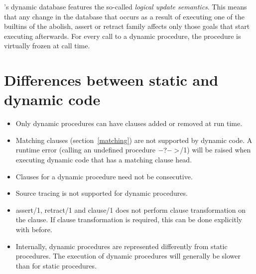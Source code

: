 {\eclipse}'s dynamic database features the so-called {\it logical update semantics}.
This means that any change in the database that occurs as a result of
executing one of the builtins of the abolish, assert or retract family
affects only those goals that start executing
afterwards. For every call to a dynamic procedure, the procedure is
virtually frozen at call time.

\section{Differences between static and dynamic code}

\begin{itemize}
\item Only dynamic procedures can have clauses added or removed at run time.
\item Matching clauses (section~\ref{matching}) are not supported by dynamic
  code. A runtime error (calling an undefined procedure $-?->$/1) will
  be raised when executing dynamic code that has a matching clause head.
\item Clauses for a dynamic procedure need not be consecutive.
\item Source tracing is not supported for dynamic procedures.
\item assert/1, retract/1 and clause/1 does not perform clause
  transformation on the clause. If clause transformation is required,
  this can be done explicitly with 
  before.
\item Internally, dynamic procedures are represented differently from static
  procedures. The execution of dynamic procedures will generally be slower
  than for static procedures.
\end{itemize}
   
